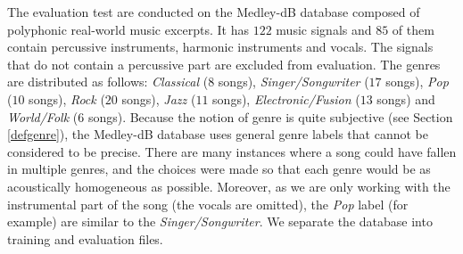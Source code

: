 \documentclass{article}
\begin{document}
The evaluation test are conducted on the Medley-dB database \cite{bittner2014medleydb} composed of polyphonic real-world music excerpts. It has $122$ music signals and $85$ of them contain percussive instruments, harmonic instruments and vocals. The signals that do not contain a percussive part are excluded from evaluation. The genres are distributed as follows: \emph{Classical} ($8$ songs), \emph{Singer/Songwriter} ($17$ songs), \emph{Pop} ($10$ songs), \emph{Rock} ($20$ songs), \emph{Jazz} ($11$ songs), \emph{Electronic/Fusion} ($13$ songs) and \emph{World/Folk} ($6$ songs). Because the notion of genre is quite subjective (see Section \ref{defgenre}), the Medley-dB database uses general genre labels that cannot be considered to be precise. There are many instances where a song could have fallen in multiple genres, and the choices were made so that each genre would be as acoustically homogeneous as possible. Moreover, as we are only working with the instrumental part of the song (the vocals are omitted), the \emph{Pop} label (for example) are similar to the \emph{Singer/Songwriter}. We separate the database into training and evaluation files. 
\end{document}

